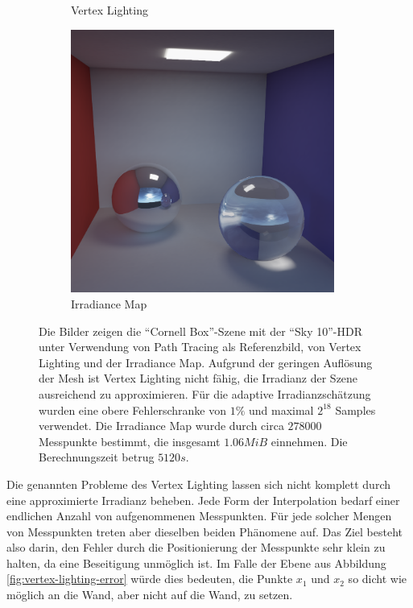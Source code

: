 \begin{figure}[h]
\begin{subfigure}[b]{0.33\textwidth}
				\caption{Vertex Lighting}
				\label{subfig:irrmap-cornell-vmap}
			\end{subfigure}
			\begin{subfigure}[b]{0.33\textwidth}
				\center
				\includegraphics[width=0.95\textwidth]{pic/irrmap-cornell-irrmap.png}
				\caption{Irradiance Map}
				\label{subfig:irrmap-cornell-irrmap}
			\end{subfigure}
			\caption[Irradiance Map der \enquote{Cornell Box}-Szene mit \enquote{Sky 10}-HDR]{Die Bilder zeigen die \enquote{Cornell Box}-Szene mit der \enquote{Sky 10}-HDR unter Verwendung von Path Tracing als Referenzbild, von Vertex Lighting und der Irradiance Map. Aufgrund der geringen Auflösung der Mesh ist Vertex Lighting nicht fähig, die Irradianz der Szene ausreichend zu approximieren. Für die adaptive Irradianzschätzung wurden eine obere Fehlerschranke von $1\unit{\%}$ und maximal $2^{18}$ Samples verwendet. Die Irradiance Map wurde durch circa $278000$ Messpunkte bestimmt, die insgesamt $1.06\unit{MiB}$ einnehmen. Die Berechnungszeit betrug $5120\unit{s}$.}
			\label{fig:irrmap-cornell}
		\end{figure}

		Die genannten Probleme des Vertex Lighting lassen sich nicht komplett durch eine approximierte Irradianz beheben.
		Jede Form der Interpolation bedarf einer endlichen Anzahl von aufgenommenen Messpunkten.
		Für jede solcher Mengen von Messpunkten treten aber dieselben beiden Phänomene auf.
		Das Ziel besteht also darin, den Fehler durch die Positionierung der Messpunkte sehr klein zu halten, da eine Beseitigung unmöglich ist.
		Im Falle der Ebene aus Abbildung \ref{fig:vertex-lighting-error} würde dies bedeuten, die Punkte $x_1$ und $x_2$ so dicht wie möglich an die Wand, aber nicht auf die Wand, zu setzen.

